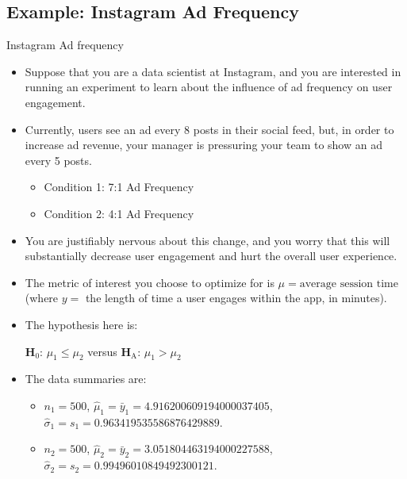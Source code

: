 \subsection{Example: Instagram Ad Frequency}
\begin{Example}{Instagram Ad frequency}{}
    \begin{itemize}
        \item Suppose that you are a data scientist at Instagram, and you are interested
              in running an experiment to learn about the influence of ad frequency on user engagement.
        \item Currently, users see an ad every 8 posts in their social feed, but, in order
              to increase ad revenue, your manager is pressuring your team to show an ad every 5 posts.
              \begin{itemize}
                  \item Condition 1: 7:1 Ad Frequency
                  \item Condition 2: 4:1 Ad Frequency
              \end{itemize}
        \item You are justifiably nervous about this change, and you worry that this
              will substantially decrease user engagement and hurt the overall user experience.
        \item The metric of interest you choose to optimize for is $ \mu=\text{average session time} $
              (where $ y =$ the length of time a user engages within the app, in minutes).
        \item The hypothesis here is:
              \begin{tightcenter}
                  $ \mathbf{H}_0 $: $ \mu_1\le \mu_2 $ versus $ \mathbf{H}_\text{A} $: $ \mu_1>\mu_2 $
              \end{tightcenter}
        \item The data summaries are:
              \begin{itemize}
                  \item $ n_1=500 $, $ \hat{\mu}_1=\bar{y}_1=\num{4.916200609194000037405} $, $ \hat{\sigma}_1=s_1=\num{0.963419535586876429889} $.
                  \item $ n_2=500 $, $ \hat{\mu}_2=\bar{y}_2=\num{3.051804463194000227588} $, $ \hat{\sigma}_2=s_2=\num{0.99496010849492300121} $.
              \end{itemize}
    \end{itemize}
    \begin{framed}

\end{framed}
\end{Example}
